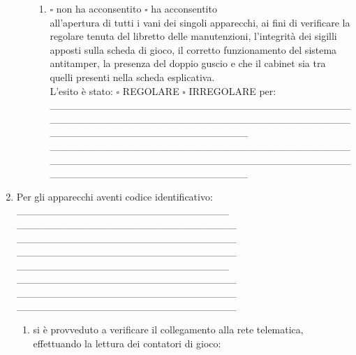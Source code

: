 \documentclass[12pt]{article}
\begin{document}
\begin{enumerate}[resume]
\begin{itemize}[label={}]
\begin{enumerate}[]
            \item \begin{math}\square\end{math} non ha acconsentito \begin{math}\square\end{math} ha acconsentito \\
            all'apertura di tutti i vani dei singoli apparecchi, ai fini di verificare la regolare tenuta del libretto delle manutenzioni, l’integrità dei sigilli apposti sulla scheda di gioco, il corretto funzionamento del sistema antitamper, la presenza del doppio guscio e che il cabinet sia tra quelli presenti nella scheda esplicativa.\\
            L'esito è stato: \begin{math}\square\end{math} REGOLARE \begin{math}\square\end{math} IRREGOLARE per:\\
            \_\_\_\_\_\_\_\_\_\_\_\_\_\_\_\_\_\_\_\_\_\_\_\_\_\_\_\_\_\_\_\_\_\_\_\_\_\_\_\_\_\_\_\_\_\_\_\_\_\_\_\_\_\_\_\_\_\_\_\_\_\_\_\_\_\_\_\_\_\_\_\_\_\_\_\_\_\_\_\_\_\_\_\_\_\_\_\_\_\_\_\_\_\_\_\_\_\_\_\_\_\_\_\_\_\_\_\_\_ \\
            \_\_\_\_\_\_\_\_\_\_\_\_\_\_\_\_\_\_\_\_\_\_\_\_\_\_\_\_\_\_\_\_\_\_\_\_\_\_\_\_\_\_\_\_\_\_\_\_\_\_\_\_\_\_\_\_\_\_\_\_\_\_\_\_\_\_\_\_\_\_\_\_\_\_\_\_\_\_\_\_\_\_\_\_\_\_\_\_\_\_\_\_\_\_\_\_\_\_\_\_\_\_\_\_\_\_\_\_\_
        \end{enumerate}
    \end{itemize}
    \item Per gli apparecchi aventi codice identificativo:\\
    \_\_\_\_\_\_\_\_\_\_\_\_\_\_\_\_\_\_\_\_\_\_\_\_\_\_\_\_\_ \_\_\_\_\_\_\_\_\_\_\_\_\_\_\_\_\_\_\_\_\_\_\_\_\_\_\_\_\_\_   \_\_\_\_\_\_\_\_\_\_\_\_\_\_\_\_\_\_\_\_\_\_\_\_\_\_\_\_\_\_ \_\_\_\_\_\_\_\_\_\_\_\_\_\_\_\_\_\_\_\_\_\_\_\_\_\_\_\_\_\_ \\
    \_\_\_\_\_\_\_\_\_\_\_\_\_\_\_\_\_\_\_\_\_\_\_\_\_\_\_\_\_ \_\_\_\_\_\_\_\_\_\_\_\_\_\_\_\_\_\_\_\_\_\_\_\_\_\_\_\_\_\_   \_\_\_\_\_\_\_\_\_\_\_\_\_\_\_\_\_\_\_\_\_\_\_\_\_\_\_\_\_\_ \_\_\_\_\_\_\_\_\_\_\_\_\_\_\_\_\_\_\_\_\_\_\_\_\_\_\_\_\_\_
    \begin{enumerate}
        \item si è provveduto a verificare il collegamento alla rete telematica, effettuando la lettura dei contatori di gioco:
        \begin{itemize}[label={}]

\end{itemize}
\end{enumerate}
\end{enumerate}
\end{document}
